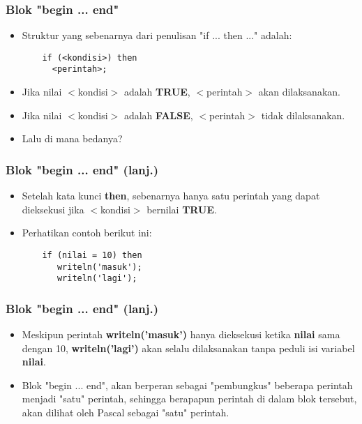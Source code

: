 \begin{frame}[fragile]
\frametitle{Blok "begin ... end"}
\begin{itemize}
  \item Struktur yang sebenarnya dari penulisan "if ... then ..." adalah:
  \begin{lstlisting}
    if (<kondisi>) then
      <perintah>;
  \end{lstlisting}
  \item Jika nilai $<$kondisi$>$ adalah \textbf{TRUE}, $<$perintah$>$ akan dilaksanakan.
  \item Jika nilai $<$kondisi$>$ adalah \textbf{FALSE}, $<$perintah$>$ tidak dilaksanakan.
  \item Lalu di mana bedanya?
\end{itemize}
\end{frame}

\begin{frame}[fragile]
\frametitle{Blok "begin ... end" (lanj.)}
\begin{itemize}
  \item Setelah kata kunci \textbf{then}, sebenarnya hanya \alert{satu} perintah yang dapat dieksekusi jika $<$kondisi$>$ bernilai \textbf{TRUE}.
  \item Perhatikan contoh berikut ini:
  \begin{lstlisting}
    if (nilai = 10) then
       writeln('masuk');
       writeln('lagi');
  \end{lstlisting}
\end{itemize}
\end{frame}

\begin{frame}[fragile]
\frametitle{Blok "begin ... end" (lanj.)}
\begin{itemize}
  \item Meskipun perintah \textbf{writeln('masuk')} hanya dieksekusi ketika \textbf{nilai} sama dengan 10, \textbf{writeln('lagi')} akan \alert{selalu dilaksanakan} tanpa peduli isi variabel \textbf{nilai}.
  \item Blok "begin ... end", akan berperan sebagai "pembungkus" beberapa perintah menjadi "satu" perintah, sehingga berapapun perintah di dalam blok tersebut, akan dilihat oleh Pascal sebagai "satu" perintah.
\end{itemize}
\end{frame}

